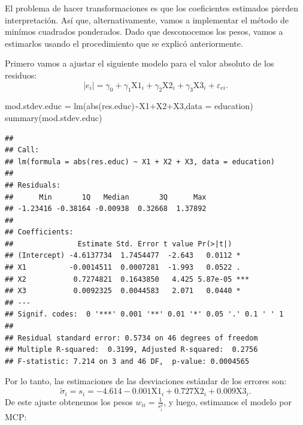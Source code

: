 \documentclass[
]{article}
\newenvironment{Shaded}{\begin{snugshade}}{\end{snugshade}}
\newcommand{\AttributeTok}[1]{\textcolor[rgb]{0.77,0.63,0.00}{#1}}
\newcommand{\DecValTok}[1]{\textcolor[rgb]{0.00,0.00,0.81}{#1}}
\newcommand{\FunctionTok}[1]{\textcolor[rgb]{0.00,0.00,0.00}{#1}}
\newcommand{\NormalTok}[1]{#1}
\newcommand{\OtherTok}[1]{\textcolor[rgb]{0.56,0.35,0.01}{#1}}
\newcommand{\SpecialCharTok}[1]{\textcolor[rgb]{0.00,0.00,0.00}{#1}}
\begin{document}
El problema de hacer transformaciones es que los coeficientes estimados pierden interpretación. Así que, alternativamente, vamos a implementar el método de minímos cuadrados ponderados. Dado que desconocemos los pesos, vamos a estimarlos usando el procedimiento que se explicó anteriormente.

Primero vamos a ajustar el siguiente modelo para el valor absoluto de los residuos:
\[
|e_{i}| = \gamma_{0} + \gamma_{1}\mbox{X1}_{i}+ \gamma_{2}\mbox{X2}_{i} + \gamma_{3}\mbox{X3}_{i} + \varepsilon_{ei}.
\]

\begin{Shaded}
\begin{Highlighting}[]
\NormalTok{mod.stdev.educ }\OtherTok{=} \FunctionTok{lm}\NormalTok{(}\FunctionTok{abs}\NormalTok{(res.educ)}\SpecialCharTok{\textasciitilde{}}\NormalTok{X1}\SpecialCharTok{+}\NormalTok{X2}\SpecialCharTok{+}\NormalTok{X3,}\AttributeTok{data =}\NormalTok{ education)}
\FunctionTok{summary}\NormalTok{(mod.stdev.educ)}
\end{Highlighting}
\end{Shaded}

\begin{verbatim}
## 
## Call:
## lm(formula = abs(res.educ) ~ X1 + X2 + X3, data = education)
## 
## Residuals:
##      Min       1Q   Median       3Q      Max 
## -1.23416 -0.38164 -0.00938  0.32668  1.37892 
## 
## Coefficients:
##               Estimate Std. Error t value Pr(>|t|)    
## (Intercept) -4.6137734  1.7454477  -2.643   0.0112 *  
## X1          -0.0014511  0.0007281  -1.993   0.0522 .  
## X2           0.7274821  0.1643850   4.425 5.87e-05 ***
## X3           0.0092325  0.0044583   2.071   0.0440 *  
## ---
## Signif. codes:  0 '***' 0.001 '**' 0.01 '*' 0.05 '.' 0.1 ' ' 1
## 
## Residual standard error: 0.5734 on 46 degrees of freedom
## Multiple R-squared:  0.3199, Adjusted R-squared:  0.2756 
## F-statistic: 7.214 on 3 and 46 DF,  p-value: 0.0004565
\end{verbatim}

Por lo tanto, las estimaciones de las desviaciones estándar de los errores son:
\[
\widetilde{\sigma}_{i} = s_{i} = -4.614  -0.001\mbox{X1}_{i} + 0.727\mbox{X2}_{i} + 0.009\mbox{X3}_{i}.
\]
De este ajuste obtenemos los pesos \(w_{ii} = \frac{1}{s_{i}^{2}}\), y luego, estimamos el modelo por MCP:

\begin{Shaded}
\end{Shaded}
\end{document}
